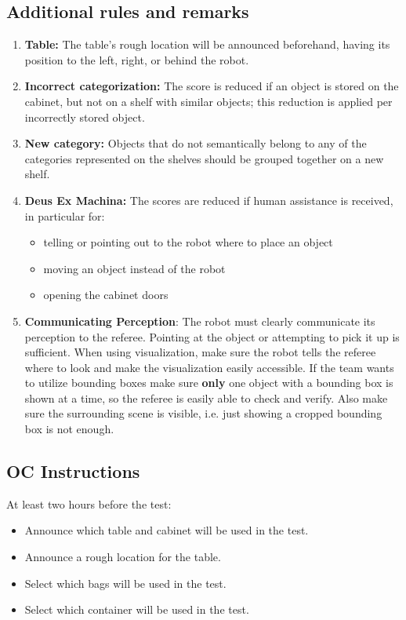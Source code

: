 \subsection*{Additional rules and remarks}
\begin{enumerate}
	\item \textbf{Table:} The table's rough location will be announced beforehand, having its position to the left, right, or behind the robot.
	\item \textbf{Incorrect categorization:} The score is reduced if an object is stored on the cabinet, but not on a shelf with similar objects; this reduction is applied per incorrectly stored object.
	\item \textbf{New category:} Objects that do not semantically belong to any of the categories represented on the shelves should be grouped together on a new shelf.
	\item \textbf{Deus Ex Machina:} The scores are reduced if human assistance is received, in particular for:
	\begin{itemize}
		\item telling or pointing out to the robot where to place an object
		\item moving an object instead of the robot
		\item opening the cabinet doors
	\end{itemize}
	\item \textbf{Communicating Perception}: The robot must clearly communicate its perception to the referee.
	Pointing at the object or attempting to pick it up is sufficient.
	When using visualization, make sure the robot tells the referee where to look and make the visualization easily accessible. 
	If the team wants to utilize bounding boxes make sure \textbf{only} one object with a bounding box is shown at a time, so the referee is easily able to check and verify.
	Also make sure the surrounding scene is visible, i.e. just showing a cropped bounding box is not enough.
\end{enumerate}

\subsection*{OC Instructions}

At least two hours before the test:
\begin{itemize}
	\item Announce which table and cabinet will be used in the test.
	\item Announce a rough location for the table.
	\item Select which bags will be used in the test.
	\item Select which container will be used in the test.
\end{itemize}

